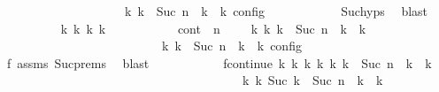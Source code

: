 \begin{isabellebody}
\ \ \ \ \ \ \ \ \ \ \ \ \ \ \ \ {\isasymand}\ {\isasymrho}\ {\isasymin}\ {\isasymlbrakk}\ {\isasymGamma}\isactrlsub k{\isacharcomma}\ {\isasymdelta}k\ {\isacharplus}\ Suc\ n\ {\isasymturnstile}\ {\isasymPsi}\isactrlsub k\ {\isasymtriangleright}\ {\isasymPhi}\isactrlsub k\ {\isasymrbrakk}\isactrlsub c\isactrlsub o\isactrlsub n\isactrlsub f\isactrlsub i\isactrlsub g{\isacartoucheclose}\isanewline
\ \ \ \ \ \ \ \ \ \ \isamarkupfalse%
\ Suc{\isachardot}hyps\ \isamarkupfalse%
\ blast\isanewline
\ \ \ \ \ \ \ \ \isamarkupfalse%
\ {\isasymGamma}\isactrlsub k\ {\isasymPsi}\isactrlsub k\ {\isasymPhi}\isactrlsub k\ k\isanewline
\ \ \ \ \ \ \ \ \ \ \ cont{\isacharcolon}\ {\isacartoucheopen}{\isacharparenleft}{\isacharparenleft}{\isasymGamma}{\isacharcomma}\ n\ {\isasymturnstile}\ {\isasymPsi}\ {\isasymtriangleright}\ {\isasymPhi}{\isacharparenright}\ {\isasymhookrightarrow}\isactrlbsup k\isactrlesup \ {\isacharparenleft}{\isasymGamma}\isactrlsub k{\isacharcomma}\ {\isasymdelta}k\ {\isacharplus}\ Suc\ n\ {\isasymturnstile}\ {\isasymPsi}\isactrlsub k\ {\isasymtriangleright}\ {\isasymPhi}\isactrlsub k{\isacharparenright}{\isacharparenright}\isanewline
\ \ \ \ \ \ \ \ \ \ \ \ \ \ \ \ \ \ \ \ \ \ {\isasymand}\ {\isasymrho}\ {\isasymin}\ {\isasymlbrakk}\ {\isasymGamma}\isactrlsub k{\isacharcomma}\ {\isasymdelta}k\ {\isacharplus}\ Suc\ n\ {\isasymturnstile}\ {\isasymPsi}\isactrlsub k\ {\isasymtriangleright}\ {\isasymPhi}\isactrlsub k\ {\isasymrbrakk}\isactrlsub c\isactrlsub o\isactrlsub n\isactrlsub f\isactrlsub i\isactrlsub g{\isacartoucheclose}\isanewline
\ \ \ \ \ \ \ \ \ \ \isamarkupfalse%
\ f{}\ assms{\isacharparenleft}{}{\isacharparenright}\ Suc{\isachardot}prems\ \isamarkupfalse%
\ blast\isanewline
\ \ \ \ \ \ \ \ \isamarkupfalse%
\ \isamarkupfalse%
\ fcontinue{\isacharcolon}\ {\isacartoucheopen}{\isasymexists}{\isasymGamma}\isactrlsub k{\isacharprime}\ {\isasymPsi}\isactrlsub k{\isacharprime}\ {\isasymPhi}\isactrlsub k{\isacharprime}\ k{\isacharprime}{\isachardot}\ {\isacharparenleft}{\isacharparenleft}{\isasymGamma}\isactrlsub k{\isacharcomma}\ {\isasymdelta}k\ {\isacharplus}\ Suc\ n\ {\isasymturnstile}\ {\isasymPsi}\isactrlsub k\ {\isasymtriangleright}\ {\isasymPhi}\isactrlsub k{\isacharparenright}\isanewline
\ \ \ \ \ \ \ \ \ \ \ \ \ \ \ \ \ \ \ \ \ \ \ \ \ \ \ \ \ \ \ \ \ \ \ \ \ \ \ {\isasymhookrightarrow}\isactrlbsup k{\isacharprime}\isactrlesup \ {\isacharparenleft}{\isasymGamma}\isactrlsub k{\isacharprime}{\isacharcomma}\ Suc\ {\isacharparenleft}{\isasymdelta}k\ {\isacharplus}\ Suc\ n{\isacharparenright}\ {\isasymturnstile}\ {\isasymPsi}\isactrlsub k{\isacharprime}\ {\isasymtriangleright}\ {\isasymPhi}\isactrlsub k{\isacharprime}{\isacharparenright}{\isacharparenright}\isanewline

\end{isabellebody}
